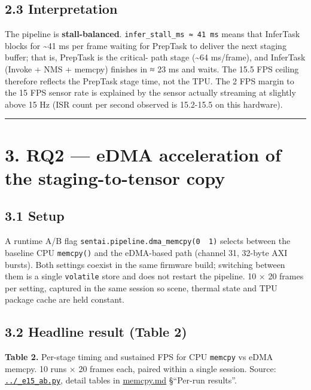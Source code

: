 \subsection{2.3 Interpretation}\label{interpretation}

The pipeline is \textbf{stall-balanced}.
\texttt{infer\_stall\_ms\ ≈\ 41\ ms} means that InferTask blocks for
\textasciitilde41 ms per frame waiting for PrepTask to deliver the next
staging buffer; that is, PrepTask is the critical- path stage
(\textasciitilde64 ms/frame), and InferTask (Invoke + NMS + memcpy)
finishes in ≈ 23 ms and waits. The 15.5 FPS ceiling therefore reflects
the PrepTask stage time, not the TPU. The 2 FPS margin to the 15 FPS
sensor rate is explained by the sensor actually streaming at slightly
above 15 Hz (ISR count per second observed is 15.2-15.5 on this
hardware).

\begin{center}\rule{0.5\linewidth}{0.5pt}\end{center}

\section{3. RQ2 --- eDMA acceleration of the staging-to-tensor
copy}\label{rq2-edma-acceleration-of-the-staging-to-tensor-copy}

\subsection{3.1 Setup}\label{setup-1}

A runtime A/B flag
\texttt{sentai.pipeline.dma\_memcpy(0\ \textbar{}\ 1)} selects between
the baseline CPU \texttt{memcpy()} and the eDMA-based path (channel 31,
32-byte AXI bursts). Both settings coexist in the same firmware build;
switching between them is a single \texttt{volatile} store and does not
restart the pipeline. 10 × 20 frames per setting, captured in the same
session so scene, thermal state and TPU package cache are held constant.

\subsection{3.2 Headline result (Table
2)}\label{headline-result-table-2}

\textbf{Table 2.} Per-stage timing and sustained FPS for CPU
\texttt{memcpy} vs eDMA memcpy. 10 runs × 20 frames each, paired within
a single session. Source:
\href{../_e15_ab.py}{\texttt{../\_e15\_ab.py}}, detail tables in
\url{memcpy.md} §``Per-run results''.

